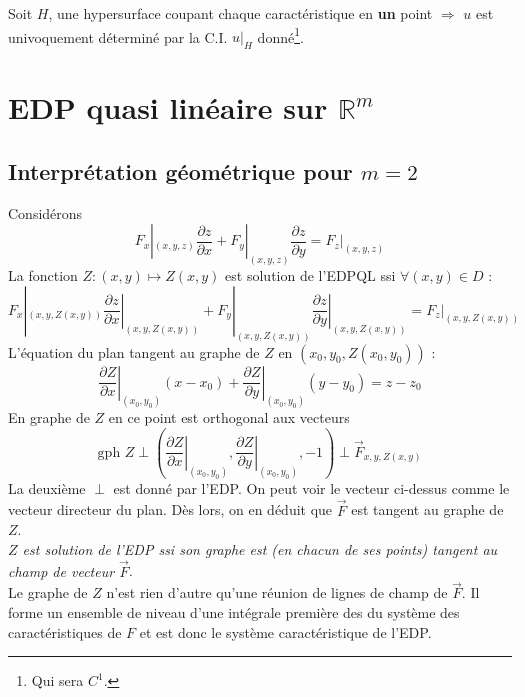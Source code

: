 	Soit $H$, une hypersurface coupant chaque caractéristique en 
	\textbf{un} point $\Rightarrow$ $u$ est univoquement déterminé par 
	la C.I. $u|_H$ donné\footnote{Qui sera $C^1$.}.
	
\section{EDP quasi linéaire sur $\mathbb{R}^m$}
	\subsection{Interprétation géométrique pour $m=2$}
	Considérons 
	\begin{equation}
	F_x|_{(x,y,z)}\dfrac{\partial z}{\partial x}+F_y|_{(x,y,z)}\dfrac{
	\partial z}{\partial y} = F_z|_{(x,y,z)}
	\end{equation}
	La fonction $Z : (x,y)\mapsto Z(x,y)$ est solution de l'EDPQL ssi 
	$\forall (x,y)\in D$ : 
	\begin{equation}
	F_x|_{(x,y,Z(x,y))}\left.\dfrac{\partial z}{\partial x}\right|_{
	(x,y,Z(x,y))}+	F_y|_{(x,y,Z(x,y))}\left.\dfrac{\partial z}{\partial 
	y}\right|_{(x,y,Z(x,y))} = F_z|_{(x,y,Z(x,y))}	
	\end{equation}
	L'équation du plan tangent au graphe de $Z$ en $(x_0,y_0,Z(x_0,y_0))$ :
	\begin{equation}
	\left.\dfrac{\partial Z}{\partial x}\right|_{(x_0,y_0)}(x-x_0)+
	\left.\dfrac{\partial Z}{\partial y}\right|_{(x_0,y_0)}(y-y_0)=z-z_0
	\end{equation}
	En graphe de $Z$ en ce point est orthogonal aux vecteurs 
	\begin{equation}
	\text{gph }Z \perp \left(\left.\dfrac{\partial Z}{\partial x}\right|_{
	(x_0,y_0)}, \left.\dfrac{\partial Z}{\partial y}\right|_{(x_0,y_0)},
	-1\right) \perp 	\vec{F}_{x,y,Z(x,y)}
	\end{equation}
	La deuxième $\perp$ est donné par l'EDP. On peut voir le vecteur 
	ci-dessus comme le vecteur directeur du plan. Dès lors, on en déduit 
	que $\vec{F}$ est tangent au graphe de $Z$.\\
	\textit{$Z$ est solution de l'EDP ssi son graphe est (en chacun de 
	ses points) tangent au champ de vecteur $\vec{F}$}.\\

	 Le graphe de $Z$ 
	n'est rien d'autre qu'une réunion de lignes de champ de $\vec{F}$. Il 
	forme un ensemble de niveau d'une intégrale première des du système 
	des caractéristiques de $F$ et est donc le système caractéristique de 
	l'EDP.
	
